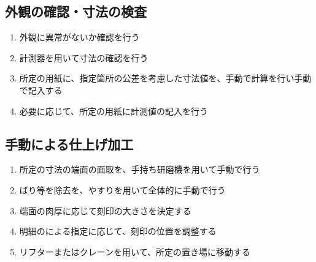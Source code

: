 \subsection{外観の確認・寸法の検査}
\begin{enumerate}
\item {}外観に異常がないか確認を行う
\item {}計測器を用いて寸法の確認を行う
\item 所定の用紙に、指定箇所の公差を考慮した寸法値を、手動で計算を行い手動で記入する
\item 必要に応じて、所定の用紙に計測値の記入を行う
\end{enumerate}


\subsection{手動による仕上げ加工}
\begin{enumerate}
\item 所定の寸法の端面の面取を、手持ち研磨機を用いて手動で行う
\item {}ばり等を除去を、やすりを用いて全体的に手動で行う
\item {}端面の肉厚に応じて刻印の大きさを決定する
\item 明細のによる指定に応じて、刻印の位置を調整する
\item リフターまたはクレーンを用いて、所定の置き場に移動する
\end{enumerate}


